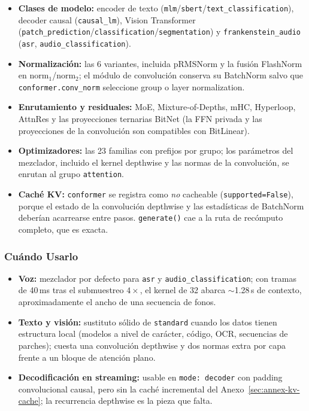 \begin{itemize}[leftmargin=*]
    \item \textbf{Clases de modelo:} encoder de texto (\texttt{mlm}/\texttt{sbert}/\texttt{text\_classification}), decoder causal (\texttt{causal\_lm}), Vision Transformer (\texttt{patch\_prediction}/\texttt{classification}/\texttt{segmentation}) y \texttt{frankenstein\_audio} (\texttt{asr}, \texttt{audio\_classification}).
    \item \textbf{Normalización:} las 6 variantes, incluida pRMSNorm y la fusión FlashNorm en $\mathrm{norm}_1$/$\mathrm{norm}_2$; el módulo de convolución conserva su BatchNorm salvo que \texttt{conformer.conv\_norm} seleccione group o layer normalization.
    \item \textbf{Enrutamiento y residuales:} MoE, Mixture-of-Depths, mHC, Hyperloop, AttnRes y las proyecciones ternarias BitNet (la FFN privada y las proyecciones de la convolución son compatibles con BitLinear).
    \item \textbf{Optimizadores:} las 23 familias con prefijos por grupo; los parámetros del mezclador, incluido el kernel depthwise y las normas de la convolución, se enrutan al grupo \texttt{attention}.
    \item \textbf{Caché KV:} \texttt{conformer} se registra como \emph{no} cacheable (\texttt{supported=False}), porque el estado de la convolución depthwise y las estadísticas de BatchNorm deberían acarrearse entre pasos. \texttt{generate()} cae a la ruta de recómputo completo, que es exacta.
\end{itemize}

\subsubsection{Cuándo Usarlo}

\begin{itemize}[leftmargin=*]
    \item \textbf{Voz:} mezclador por defecto para \texttt{asr} y \texttt{audio\_classification}; con tramas de 40\,ms tras el submuestreo $4\times$, el kernel de 32 abarca $\sim$1.28\,s de contexto, aproximadamente el ancho de una secuencia de fonos.
    \item \textbf{Texto y visión:} sustituto sólido de \texttt{standard} cuando los datos tienen estructura local (modelos a nivel de carácter, código, OCR, secuencias de parches); cuesta una convolución depthwise y dos normas extra por capa frente a un bloque de atención plano.
    \item \textbf{Decodificación en streaming:} usable en \texttt{mode: decoder} con padding convolucional causal, pero sin la caché incremental del Anexo~\ref{sec:annex-kv-cache}; la recurrencia depthwise es la pieza que falta.
\end{itemize}

